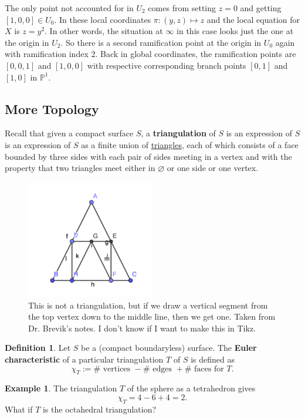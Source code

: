 \documentclass[12pt]{article}
\newcommand{\p}{\mathbb{P}}
\theoremstyle{definition}
\newtheorem{definition}[theorem]{Definition}
\newtheorem{example}[theorem]{Example}
\theoremstyle{remark}
\begin{document}
The only point not accounted for in $U_2$ comes from setting $z = 0$ and getting $[1,0,0] \in U_0$. In these local coordinates $\pi : (y,z) \mapsto z$ and the local equation for $X$ is $z = y^2$. In other words, the situation at $\infty$ in this case looks just the one at the origin in $U_2$. So there is a second ramification point at the origin in $U_0$ again with ramification index 2. Back in global coordinates, the ramification points are $[0,0,1]$ and $[1,0,0]$ with respective corresponding branch points $[0,1]$ and $[1,0]$ in $\p^1$.
\subsection{More Topology}
Recall that given a compact surface $S$, a \textbf{triangulation} of $S$ is an expression of $S$ is an expression of $S$ as a finite union of \underline{triangles}, each of which consists of a face bounded by three sides with each pair of sides meeting in a vertex and with the property that two triangles meet either in $\varnothing$ or one side or one vertex.
\begin{figure}[H]
    \centering
    \includegraphics[width = 0.5\textwidth]{15.png}
    \caption{This is not a triangulation, but if we draw a vertical segment from the top vertex down to the middle line, then we get one. Taken from Dr. Brevik's notes. I don't know if I want to make this in Tikz.}
    \label{fig:Fig15}
\end{figure}
\begin{definition}
    Let $S$ be a (compact boundaryless) surface. The \textbf{Euler characteristic} of a particular triangulation $T$ of $S$ is defined as 
    \begin{equation}
        \chi_T := \#\text{ vertices } - \#\text{ edges } + \#\text{ faces for }T.
    \end{equation}
\end{definition}
\begin{example}
    The triangulation $T$ of the sphere as a tetrahedron gives 
    \begin{equation}
        \chi_T = 4 - 6 + 4 = 2.
    \end{equation}
    What if $T$ is the octahedral triangulation?
\end{example}
\end{document}
